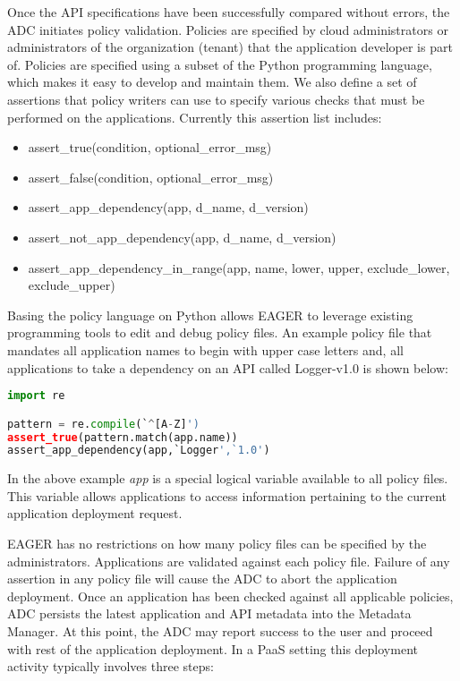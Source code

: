 Once the API specifications have been successfully compared without errors,
the ADC initiates policy validation. Policies are specified by cloud
administrators or administrators of the organization (tenant) that the
application developer is part of. Policies are specified using a subset of the
Python programming language, which makes it easy to develop and maintain them.
We also define a set of assertions
that policy writers can use to specify various checks that must be performed
on the applications. 
Currently this assertion list includes:
\begin{itemize}
\item assert\_true(condition, optional\_error\_msg)
\item assert\_false(condition, optional\_error\_msg)
\item assert\_app\_dependency(app, d\_name, d\_version)
\item assert\_not\_app\_dependency(app, d\_name, d\_version)
\item assert\_app\_dependency\_in\_range(app, name, lower, upper, exclude\_lower, exclude\_upper)
\end{itemize}

Basing the policy language on Python allows EAGER to leverage
existing programming tools to edit and debug policy files. An example policy
file that mandates all application names to begin with upper case letters and,
all applications to take a dependency on an API called Logger-v1.0 is shown
below:

\begin{lstlisting}[language=Python, frame=single]
import re

pattern = re.compile(`^[A-Z]')
assert_true(pattern.match(app.name))
assert_app_dependency(app,`Logger',`1.0')
\end{lstlisting}

In the above example \textit{app} is a special logical variable available to
all policy files. This variable allows applications to access information
pertaining to the current application deployment request. 

EAGER has no restrictions on how many policy files can be specified by the
administrators. Applications are validated against each policy file. Failure
of any assertion in any policy file will cause the ADC to abort the
application deployment. Once an application has been checked against all
applicable policies, ADC persists the latest application and API metadata into
the Metadata Manager.  At this point, the ADC may report success to the user
and proceed with rest of the application deployment. In a PaaS setting
this deployment
activity typically involves three
steps:

